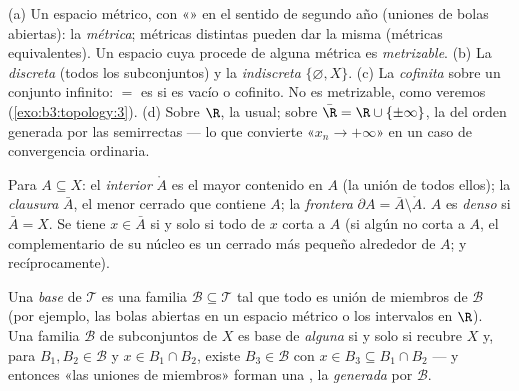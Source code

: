 \begin{example}\label{ex:b3:topology:examples}
(a) Un espacio métrico, con «» en el sentido de segundo año
(uniones de bolas abiertas): la
\emph{ métrica}; métricas
distintas pueden dar la misma
 (métricas equivalentes). Un
espacio cuya  procede de
alguna métrica es \emph{metrizable}. (b) La
 \emph{discreta} (todos los
subconjuntos) y la 
\emph{indiscreta} $\{\varnothing, X\}$. (c) La
 \emph{cofinita} sobre un
conjunto infinito: $=$ es  si es vacío o cofinito. No es
metrizable, como veremos
(\cref{exo:b3:topology:3}).
(d) Sobre $\R$, la  usual;
sobre $\bar\R = \R \cup
\{\pm\infty\}$, la  del
orden generada por las semirrectas --- lo que convierte
«$x_n \to +\infty$» en un caso de convergencia ordinaria.
\end{example}

\begin{definition}\label{def:b3:topology:interior}
Para $A \subseteq X$: el \emph{interior} $\mathring A$ es el mayor
 contenido en $A$ (la unión de
todos ellos); la \emph{clausura} $\bar A$, el menor
cerrado que contiene $A$; la \emph{frontera} $\partial A = \bar A
\setminus \mathring A$. $A$ es \emph{denso} si
$\bar A = X$. Se tiene $x \in \bar A$ si y solo si todo
 de $x$ corta a $A$ (si algún
 no corta a $A$, el
complementario de su núcleo  es un cerrado más pequeño alrededor
de $A$; y recíprocamente).
\end{definition}

\begin{definition}\label{def:b3:topology:basis}
Una \emph{base} de $\mathcal T$ es una
familia $\mathcal B \subseteq \mathcal T$ tal que todo
 es unión de miembros de
$\mathcal B$ (por ejemplo, las bolas abiertas en un espacio métrico o
los intervalos  en $\R$). Una familia $\mathcal B$ de
subconjuntos de $X$ es base de \emph{alguna}
 si y solo si recubre $X$ y,
para $B_1, B_2 \in \mathcal B$ y $x \in B_1 \cap B_2$, existe
$B_3 \in \mathcal B$ con $x \in B_3 \subseteq B_1\cap B_2$ --- y
entonces «las uniones de miembros» forman una
, la
 \emph{generada} por
$\mathcal B$.
\end{definition}

